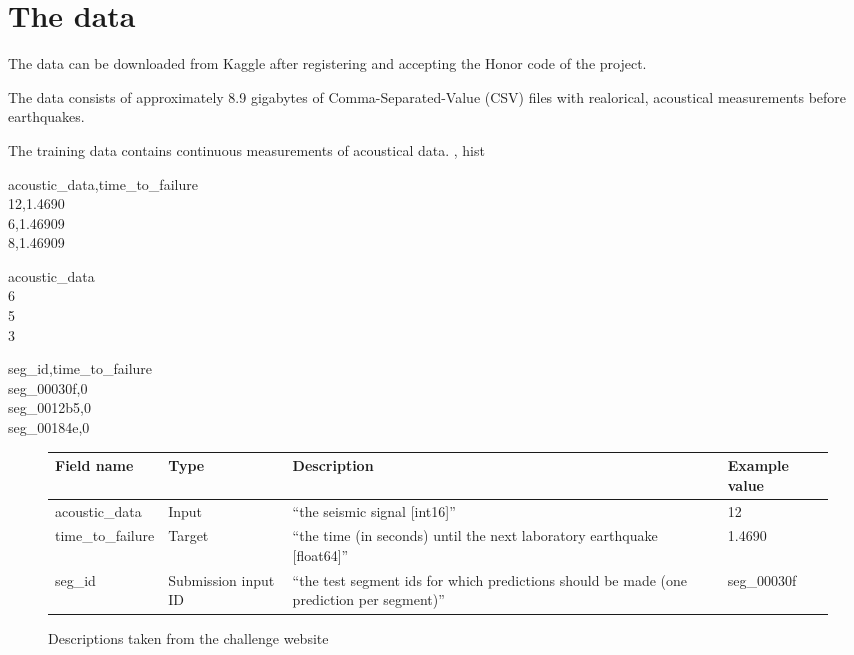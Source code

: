 \documentclass[colorback,accentcolor=tud9c,12pt]{tudreport}
\begin{document}
	\section{The data}
	The data can be downloaded from Kaggle after registering and accepting the Honor code of the project.
	
	The data consists of approximately 8.9 gigabytes of Comma-Separated-Value (CSV) files with realorical, acoustical measurements before earthquakes.
	
	The training data contains continuous measurements of acoustical data.
	, hist
	\vspace{8mm}
	
	\begin{minipage}[b]{0.33333\textwidth}
		acoustic\_data,time\_to\_failure\\
		12,1.4690\\
		6,1.46909\\
		8,1.46909
		\label{fig:data_train}
	\end{minipage}%
	\begin{minipage}[b]{0.33333\textwidth}
		acoustic\_data\\
		6\\
		5\\
		3
	\end{minipage}%
	\begin{minipage}[b]{0.33333\textwidth}
		seg\_id,time\_to\_failure\\
		seg\_00030f,0\\
		seg\_0012b5,0\\
		seg\_00184e,0
	\end{minipage}%

	\vspace{8mm}
	
	
	\begin{figure}[htp]
		\begin{tabularx}{\textwidth}{ L{8}|L{5}|L{12}|L{7} }
			Field name & Type & Description & Example value \\
			\hline 
			acoustic\_data & Input & ``the seismic signal [int16]'' & 12 \\
			\hline 
			time\_to\_failure & Target & ``the time (in seconds) until the next laboratory earthquake [float64]''  & 1.4690 \\
			\hline 
			seg\_id & Submission input ID & ``the test segment ids for which predictions should be made (one prediction per segment)'' & seg\_00030f \\
		\end{tabularx}
		\caption{Descriptions taken from the challenge website}
	\end{figure}
	
\end{document}
